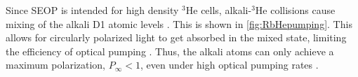 
Since SEOP is intended for high density $^3$He cells, alkali-$^3$He collisions cause mixing of the alkali D1 atomic levels \cite{Lancor2010}. This is shown in \cref{fig:RbHepumping}. This allows for circularly polarized light to get absorbed in the mixed state, limiting the efficiency of optical pumping \cite{Lancor2010}. Thus, the alkali atoms can only achieve a maximum polarization, $P_{\infty}<1$, even under high optical pumping rates \cite{Lancor2010}.

